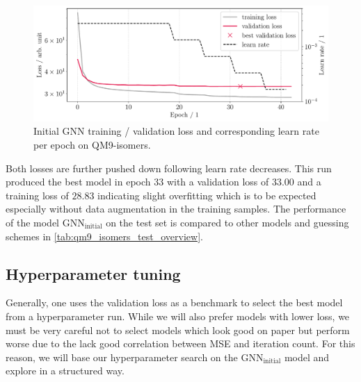 \begin{figure}[H]
    \centering
    \includegraphics[width=\textwidth]{../fig/gnn/MGNN_6-31G_NO_AUG_07_07_manual_ref_train_val_loss.pdf}
    \caption[Initial GNN loss on QM9-isomers]{Initial GNN training / validation loss and corresponding learn rate per epoch on QM9-isomers.}
    \label{fig:initial_train_qm9_isomers}
\end{figure}
Both losses are further pushed down following learn rate decreases. This run produced the best model in epoch 33 with a validation loss of $33.00$ and a training loss of $28.83$ indicating slight overfitting which is to be expected especially without data augmentation in the training samples. The performance of the model $\text{GNN}_\text{initial}$ on the test set is compared to other models and guessing schemes in \autoref{tab:qm9_isomers_test_overview}. 



\subsection{Hyperparameter tuning}
\label{subsec:qm9_isomers_hyperparamtuning}
Generally, one uses the validation loss as a benchmark to select the best model from a hyperparameter run. While we will also prefer models with lower loss, we must be very careful not to select models which look good on paper but perform worse due to the lack good correlation between MSE and iteration count. For this reason, we will base our hyperparameter search on the $\text{GNN}_\text{initial}$ model and explore in a structured way. 

